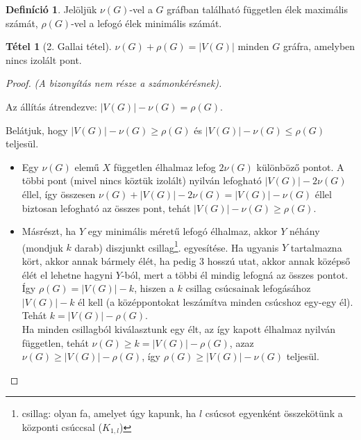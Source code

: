 \documentclass{article}
\theoremstyle{definition}
\newtheorem*{definicio}{Definíció}
\newtheorem*{tetel}{Tétel}
\begin{document}
\begin{definicio}
Jelöljük $\nu(G)$-vel a $G$ gráfban található független élek maximális számát, $\rho(G)$-vel a lefogó élek minimális számát.
\end{definicio}

\begin{tetel}[2. Gallai tétel]
$\nu(G)+\rho(G)=|V(G)|$ minden $G$ gráfra, amelyben nincs izolált pont.
\end{tetel}

\begin{proof}
{\it (A bizonyítás nem része a számonkérésnek).}

Az állítás átrendezve: $|V(G)|-\nu(G)=\rho(G)$.

Belátjuk, hogy $|V(G)|-\nu(G)\geq\rho(G)$ és $|V(G)|-\nu(G)\leq\rho(G)$ teljesül. 

\begin{itemize}
  \item Egy $\nu(G)$ elemű $X$ független élhalmaz lefog $2\nu(G)$ különböző pontot. A többi pont (mivel nincs köztük izolált) nyilván lefogható $|V(G)| - 2\nu(G)$ éllel, így összesen $\nu(G) + |V(G)| - 2\nu(G) = |V(G)| - \nu(G)$ éllel biztosan lefogható az összes pont, tehát $|V(G)| - \nu(G) \geq \rho(G)$.
  \item Másrészt, ha $Y$ egy minimális méretű lefogó élhalmaz, akkor $Y$ néhány (mondjuk $k$ darab) diszjunkt csillag\footnote{csillag: olyan fa, amelyet úgy kapunk, ha $l$ csúcsot egyenként összekötünk a központi csúccsal ($K_{1,l}$)}. egyesítése. Ha ugyanis $Y$ tartalmazna kört, akkor annak bármely élét, ha pedig 3 hosszú utat, akkor annak középső élét el lehetne hagyni $Y$-ból, mert a többi él mindig lefogná az összes pontot. Így $\rho(G) = |V(G)|-k$, hiszen a $k$ csillag csúcsainak lefogásához $|V(G)|-k$ él kell (a középpontokat leszámítva minden csúcshoz egy-egy él). Tehát $k=|V(G)|-\rho(G)$.\\Ha minden csillagból kiválasztunk egy élt, az így kapott élhalmaz nyilván független, tehát $\nu(G) \geq k = |V(G)|-\rho(G)$, azaz $\nu(G) \geq |V(G)|-\rho(G)$, így $\rho(G) \geq |V(G)|-\nu(G)$ teljesül. 
\end{itemize}
\end{proof}
\end{document}
